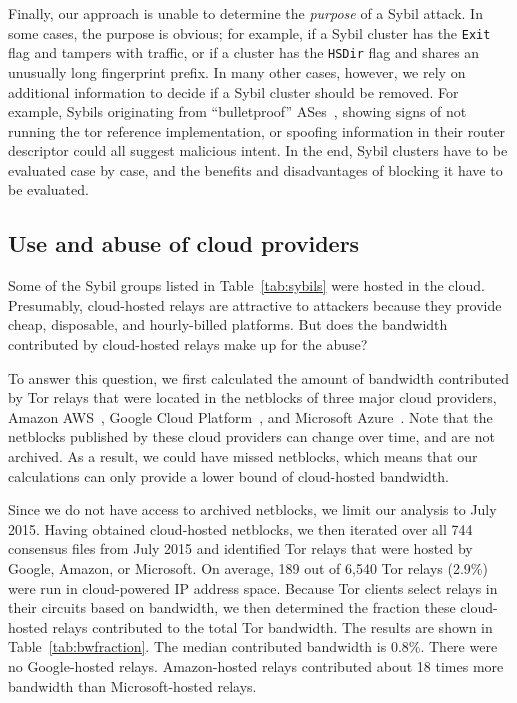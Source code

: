 Finally, our approach is unable to determine the \emph{purpose} of a Sybil
attack.  In some cases, the purpose is obvious; for example, if a Sybil cluster
has the \texttt{Exit} flag and tampers with traffic, or if a cluster has the
\texttt{HSDir} flag and shares an unusually long fingerprint prefix.  In many
other cases, however, we rely on additional information to decide if a Sybil
cluster should be removed.  For example, Sybils originating from ``bulletproof''
ASes~\cite{Konte2015a}, showing signs of not running the tor reference
implementation, or spoofing information in their router descriptor could all
suggest malicious intent.  In the end, Sybil clusters have to be evaluated case
by case, and the benefits and disadvantages of blocking it have to be evaluated.


\subsection{Use and abuse of cloud providers}
\label{sec:cloud}
Some of the Sybil groups listed in Table~\ref{tab:sybils} were hosted in the
cloud.  Presumably, cloud-hosted relays are attractive to attackers because they
provide cheap, disposable, and hourly-billed platforms.  But does the bandwidth
contributed by cloud-hosted relays make up for the abuse?

To answer this question, we first calculated the amount of bandwidth contributed
by Tor relays that were located in the netblocks of three major cloud providers,
Amazon AWS~\cite{amazonaws}, Google Cloud Platform~\cite{googlecloud}, and
Microsoft Azure~\cite{azure}.  Note that the netblocks published by these cloud
providers can change over time, and are not archived.  As a result, we could
have missed netblocks, which means that our calculations can only provide a
lower bound of cloud-hosted bandwidth.

Since we do not have access to archived netblocks, we limit our analysis to
July 2015.  Having obtained cloud-hosted netblocks, we then iterated over all
744 consensus files from July 2015 and identified Tor relays that were hosted
by Google, Amazon, or Microsoft.  On average, 189 out of 6,540 Tor relays
(2.9\%) were run in cloud-powered IP address space.  Because Tor
clients select relays in their circuits based on bandwidth, we then determined
the fraction these cloud-hosted relays contributed to the total Tor bandwidth.
The results are shown in Table~\ref{tab:bwfraction}.  The median contributed
bandwidth is 0.8\%.  There were no Google-hosted relays.  Amazon-hosted relays
contributed about 18 times more bandwidth than Microsoft-hosted relays.

